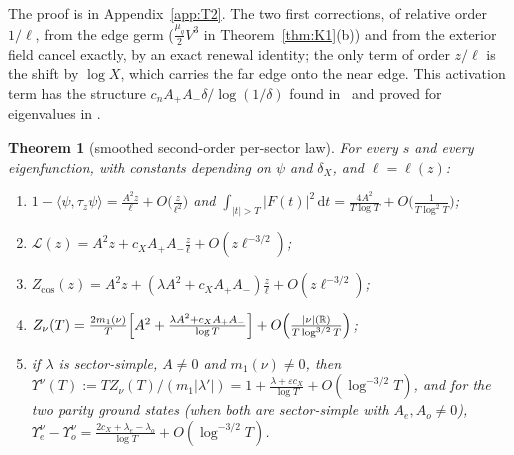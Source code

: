 \documentclass[11pt]{amsart}
\newcommand{\R}{\mathbb{R}}
\newcommand{\cL}{\mathcal{L}}
\newcommand{\dd}{\,\mathrm{d}}
\newcommand{\eps}{\varepsilon}
\newtheorem{theorem}{Theorem}[section]
\theoremstyle{definition}
\theoremstyle{remark}
\numberwithin{equation}{section}
\begin{document}
The proof is in Appendix~\ref{app:T2}. The two first corrections, of relative order $1/\ell$, from the edge germ ($\frac{\mu_q}2V^3$ in Theorem~\ref{thm:K1}(b)) and from the exterior field cancel exactly, by an exact renewal identity; the only term of order $z/\ell$ is the shift by $\log X$, which carries the far edge onto the near edge. This activation term has the structure $c_nA_+A_-\delta/\log(1/\delta)$ found in~\cite{PL338} and proved for eigenvalues in \cite[Thm.~2.4]{BT26}.

\begin{theorem}[smoothed second-order per-sector law]\label{thm:T3}
For every $s$ and every eigenfunction, with constants depending on $\psi$ and $\delta_X$, and $\ell=\ell(z)$:
\begin{enumerate}
\item[(a)] $1-\langle\psi,\tau_z\psi\rangle=\frac{A^2z}{\ell}+O\bigl(\frac z{\ell^2}\bigr)$ and $\int_{|t|>T}|F(t)|^2\dd t=\frac{4A^2}{T\log T}+O\bigl(\frac1{T\log^2T}\bigr)$;
\item[(b)] $\cL(z)=A^2z+c_XA_+A_-\frac z\ell+O(z\ell^{-3/2})$;
\item[(c)] $Z_{\cos}(z)=A^2z+(\lambda A^2+c_XA_+A_-)\frac z\ell+O(z\ell^{-3/2})$;
\item[(d)] $Z_\nu(T)=\frac{2m_1(\nu)}T\Bigl[A^2+\frac{\lambda A^2+c_XA_+A_-}{\log T}\Bigr]+O\Bigl(\frac{|\nu|(\R)}{T\log^{3/2}T}\Bigr)$;
\item[(e)] if $\lambda$ is sector-simple, $A\ne0$ and $m_1(\nu)\ne0$, then $\Upsilon^\nu(T):=TZ_\nu(T)/(m_1|\lambda'|)=1+\frac{\lambda+\eps c_X}{\log T}+O(\log^{-3/2}T)$, and for the two parity ground states (when both are sector-simple with $A_e,A_o\ne0$), $\Upsilon^\nu_e-\Upsilon^\nu_o=\frac{2c_X+\lambda_e-\lambda_o}{\log T}+O(\log^{-3/2}T)$.
\end{enumerate}
\end{theorem}
\end{document}
